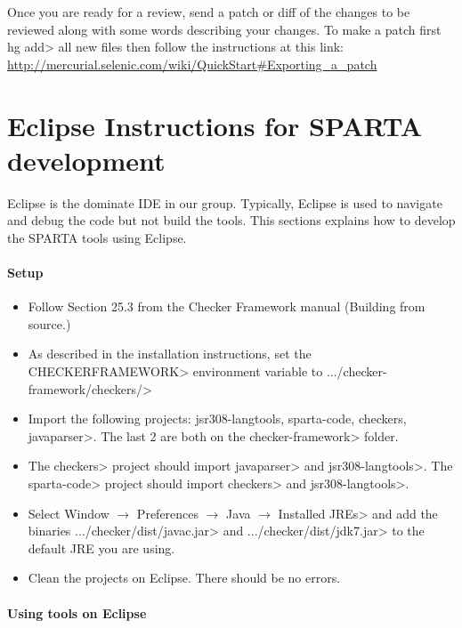 Once you are ready for a review, send a patch or diff of the changes to be reviewed along with some words describing your changes.  To make a patch first \<hg add> all new files then follow the instructions at this link: 
\url{http://mercurial.selenic.com/wiki/QuickStart#Exporting_a_patch}

\section{Eclipse Instructions for SPARTA development\label{eclipse-instructions}}

Eclipse is the dominate IDE in our group.  Typically, Eclipse is used to navigate and debug the code but not build the tools.  This sections explains how to develop the 
SPARTA tools using Eclipse.  

\paragraph{Setup}


\begin{itemize}
\item Follow Section 25.3 from the Checker Framework manual 
(Building from source.)
\item As described in the installation instructions, set the \<CHECKERFRAMEWORK>
environment variable to \<.../checker-framework/checkers/>
\item Import the following projects: \<jsr308-langtools,
sparta-code, checkers, javaparser>. The last 2 are both on the
\<checker-framework> folder.
\item The \<checkers> project should import \<javaparser> and \<jsr308-langtools>. 
The \<sparta-code> project should import \<checkers> and \<jsr308-langtools>.  
\item Select  \<Window $\rightarrow$ Preferences $\rightarrow$ Java 
$\rightarrow$ Installed JREs> and add the binaries \<.../checker/dist/javac.jar> 
and \<.../checker/dist/jdk7.jar> to the default JRE you are using.
\item Clean the projects on Eclipse. There should be no errors. 
\end{itemize}

\paragraph{Using tools on Eclipse}

